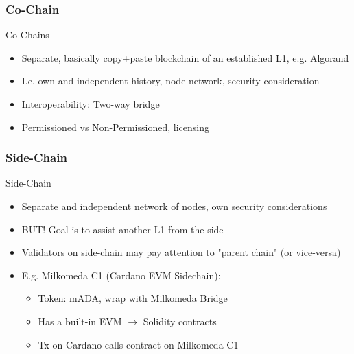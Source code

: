 \documentclass[aspectratio=169,xcolor=dvipsnames]{beamer}
\begin{document}
\subsubsection{Co-Chain}
\begin{frame}{Co-Chains}
    \begin{itemize} 
        \item Separate, basically copy+paste blockchain of an established L1, e.g. Algorand
        \item I.e. own and independent history, node network, security consideration
        \item Interoperability: Two-way bridge
        \item Permissioned vs Non-Permissioned, licensing
    \end{itemize}
\end{frame}

\subsubsection{Side-Chain}
\begin{frame}{Side-Chain}   
\begin{itemize}
    \item Separate and independent network of nodes, own security considerations
    \item BUT! Goal is to assist another L1 from the side
    \item Validators on side-chain may pay attention to "parent chain" (or vice-versa)
    \item E.g. Milkomeda C1 (Cardano EVM Sidechain):
    \begin{itemize}
        \item Token: mADA, wrap with Milkomeda Bridge
        \item Has a built-in EVM $ \rightarrow $ Solidity contracts
        \item Tx on Cardano calls contract on Milkomeda C1
    \end{itemize}
\end{itemize}
\end{frame}
\end{document}
